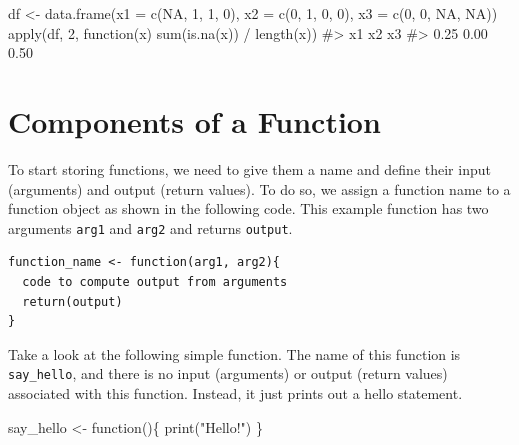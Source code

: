\documentclass[
  letterpaper,
]{latex/krantz}
\makeatletter
\newenvironment{Shaded}{\begin{snugshade}}{\end{snugshade}}
\newcommand{\AttributeTok}[1]{\textcolor[rgb]{0.40,0.45,0.13}{#1}}
\newcommand{\CommentTok}[1]{\textcolor[rgb]{0.37,0.37,0.37}{#1}}
\newcommand{\ConstantTok}[1]{\textcolor[rgb]{0.56,0.35,0.01}{#1}}
\newcommand{\ControlFlowTok}[1]{\textcolor[rgb]{0.00,0.23,0.31}{#1}}
\newcommand{\DecValTok}[1]{\textcolor[rgb]{0.68,0.00,0.00}{#1}}
\newcommand{\FunctionTok}[1]{\textcolor[rgb]{0.28,0.35,0.67}{#1}}
\newcommand{\NormalTok}[1]{\textcolor[rgb]{0.00,0.23,0.31}{#1}}
\newcommand{\OtherTok}[1]{\textcolor[rgb]{0.00,0.23,0.31}{#1}}
\newcommand{\SpecialCharTok}[1]{\textcolor[rgb]{0.37,0.37,0.37}{#1}}
\newcommand{\StringTok}[1]{\textcolor[rgb]{0.13,0.47,0.30}{#1}}
\newenvironment{kframe}{%
\medskip{}
\setlength{\fboxsep}{.8em}
 \def\at@end@of@kframe{}%
 \ifinner\ifhmode%
  \def\at@end@of@kframe{\end{minipage}}%
  \begin{minipage}{\columnwidth}%
 \fi\fi%
 \def\FrameCommand##1{\hskip\@totalleftmargin \hskip-\fboxsep
 \colorbox{shadecolor}{##1}\hskip-\fboxsep
     \hskip-\linewidth \hskip-\@totalleftmargin \hskip\columnwidth}%
 \MakeFramed {\advance\hsize-\width
   \@totalleftmargin\z@ \linewidth\hsize
   \@setminipage}}%
 {\par\unskip\endMakeFramed%
 \at@end@of@kframe}
\renewenvironment{Shaded}{\begin{kframe}}{\end{kframe}}
\makeatother
\begin{document}
\begin{Shaded}
\begin{Highlighting}[]
\NormalTok{df }\OtherTok{\textless{}{-}} \FunctionTok{data.frame}\NormalTok{(}\AttributeTok{x1 =} \FunctionTok{c}\NormalTok{(}\ConstantTok{NA}\NormalTok{, }\DecValTok{1}\NormalTok{, }\DecValTok{1}\NormalTok{, }\DecValTok{0}\NormalTok{),}
                 \AttributeTok{x2 =} \FunctionTok{c}\NormalTok{(}\DecValTok{0}\NormalTok{, }\DecValTok{1}\NormalTok{, }\DecValTok{0}\NormalTok{, }\DecValTok{0}\NormalTok{),}
                 \AttributeTok{x3 =} \FunctionTok{c}\NormalTok{(}\DecValTok{0}\NormalTok{, }\DecValTok{0}\NormalTok{, }\ConstantTok{NA}\NormalTok{, }\ConstantTok{NA}\NormalTok{))}
\FunctionTok{apply}\NormalTok{(df, }\DecValTok{2}\NormalTok{, }\ControlFlowTok{function}\NormalTok{(x) }\FunctionTok{sum}\NormalTok{(}\FunctionTok{is.na}\NormalTok{(x)) }\SpecialCharTok{/} \FunctionTok{length}\NormalTok{(x)) }
\CommentTok{\#\textgreater{}   x1   x2   x3 }
\CommentTok{\#\textgreater{} 0.25 0.00 0.50}
\end{Highlighting}
\end{Shaded}

\section{Components of a Function}\label{components-of-a-function}

To start storing functions, we need to give them a name and define their
input (arguments)  and output (return
values). To do so, we assign a function
name to a function object as shown in the following code. This example
function has two arguments \texttt{arg1} and \texttt{arg2} and returns
\texttt{output}.

\begin{verbatim}
function_name <- function(arg1, arg2){
  code to compute output from arguments
  return(output)
}
\end{verbatim}

Take a look at the following simple function. The name of this function
is \texttt{say\_hello}, and there is no input (arguments) or output
(return values) associated with this function. Instead, it just prints
out a hello statement.

\begin{Shaded}
\begin{Highlighting}[]
\NormalTok{say\_hello }\OtherTok{\textless{}{-}} \ControlFlowTok{function}\NormalTok{()\{}
  \FunctionTok{print}\NormalTok{(}\StringTok{"Hello!"}\NormalTok{)}
\NormalTok{\}}
\end{Highlighting}
\end{Shaded}
\end{document}
